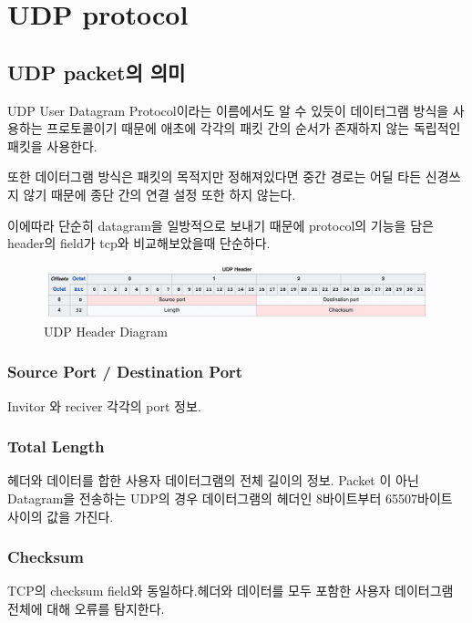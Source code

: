 \section{UDP protocol}

\subsection{UDP packet의 의미}
    UDP User Datagram Protocol이라는 이름에서도 알 수 있듯이 데이터그램 방식을 사용하는 프로토콜이기 때문에 애초에 각각의 패킷 간의 순서가 존재하지 않는 독립적인 패킷을 사용한다. 

    또한 데이터그램 방식은 패킷의 목적지만 정해져있다면 중간 경로는 어딜 타든 신경쓰지 않기 때문에 종단 간의 연결 설정 또한 하지 않는다. 
    
    이에따라 단순히 datagram을 일방적으로 보내기 때문에 protocol의 기능을 담은 header의 field가 tcp와 비교해보았을때 단순하다.\\
    \vspace{-4mm}  
    \begin{figure}[!h]\centering
		\includegraphics[width=.9\textwidth]{image/week01/2-1-1.png}
		\caption{\small UDP Header Diagram}
		\vspace{-10pt}
    \end{figure}
    
    \vspace{-2mm}
    \subsubsection*{Source Port / Destination Port}
    Invitor 와 reciver 각각의 port 정보.
    \subsubsection*{Total Length}
    헤더와 데이터를 합한 사용자 데이터그램의 전체 길이의 정보. Packet 이 아닌 Datagram을 전송하는 UDP의 경우 데이터그램의 헤더인 8바이트부터 65507바이트 사이의 값을 가진다.
    \subsubsection*{Checksum}
    TCP의 checksum field와 동일하다.헤더와 데이터를 모두 포함한 사용자 데이터그램 전체에 대해 오류를 탐지한다.
    